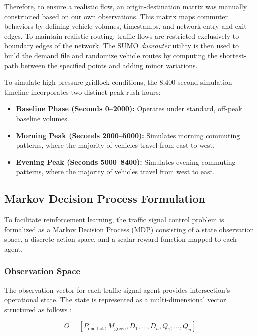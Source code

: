 \documentclass[conference]{IEEEtran}
\begin{document}
Therefore, to ensure a realistic flow, an origin-destination matrix was manually constructed based on our own observations. This matrix maps commuter behaviors by defining vehicle volumes, timestamps, and network entry and exit edges. To maintain realistic routing, traffic flows are restricted exclusively to boundary edges of the network. The SUMO \textit{duarouter} utility is then used to build the demand file and randomize vehicle routes by computing the shortest-path between the specified points and adding minor variations.

To simulate high-pressure gridlock conditions, the 8,400-second simulation timeline incorporates two distinct peak rush-hours:
\begin{itemize}
    \item \textbf{Baseline Phase (Seconds 0--2000):} Operates under standard, off-peak baseline volumes.
    \item \textbf{Morning Peak (Seconds 2000--5000):} Simulates morning commuting patterns, where the majority of vehicles travel from east to west.
    \item \textbf{Evening Peak (Seconds 5000--8400):} Simulates evening commuting patterns, where the majority of vehicles travel from west to east.
\end{itemize}

\subsection{Markov Decision Process Formulation}
To facilitate reinforcement learning, the traffic signal control problem is formalized as a Markov Decision Process (MDP) consisting of a state observation space, a discrete action space, and a scalar reward function mapped to each agent.

\subsubsection{Observation Space}
The observation vector for each traffic signal agent provides intersection's operational state. The state is represented as a multi-dimensional vector structured as follows \cite{observation}:

\begin{equation}
    O = [P_{\text{one-hot}}, M_{\text{green}}, D_{1}, \dots, D_{n}, Q_{1}, \dots, Q_{n}]
\end{equation}
\end{document}

